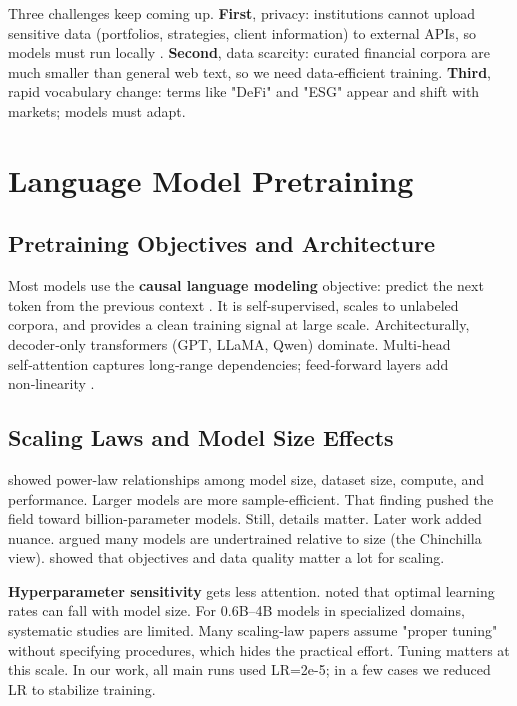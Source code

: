 Three challenges keep coming up. \textbf{First}, privacy: institutions cannot upload sensitive data (portfolios, strategies, client information) to external APIs, so models must run locally \parencite{wu2023bloomberggpt}. \textbf{Second}, data scarcity: curated financial corpora are much smaller than general web text, so we need data‑efficient training. \textbf{Third}, rapid vocabulary change: terms like "DeFi" and "ESG" appear and shift with markets; models must adapt.

\section{Language Model Pretraining}

\subsection{Pretraining Objectives and Architecture}

Most models use the \textbf{causal language modeling} objective: predict the next token from the previous context \parencite{radford2019language, brown2020language}. It is self‑supervised, scales to unlabeled corpora, and provides a clean training signal at large scale. Architecturally, decoder‑only transformers (GPT, LLaMA, Qwen) dominate. Multi‑head self‑attention captures long‑range dependencies; feed‑forward layers add non‑linearity \parencite{vaswani2017attention, touvron2023llama}.

\subsection{Scaling Laws and Model Size Effects}

\textcite{kaplan2020scaling} showed power-law relationships among model size, dataset size, compute, and performance. Larger models are more sample-efficient. That finding pushed the field toward billion-parameter models. Still, details matter. Later work added nuance. \textcite{hoffmann2022training} argued many models are undertrained relative to size (the Chinchilla view). \textcite{tay2022ul2} showed that objectives and data quality matter a lot for scaling.

\textbf{Hyperparameter sensitivity} gets less attention. \textcite{mccandlish2018empirical} noted that optimal learning rates can fall with model size. For 0.6B--4B models in specialized domains, systematic studies are limited. Many scaling‑law papers assume "proper tuning" without specifying procedures, which hides the practical effort. Tuning matters at this scale. In our work, all main runs used LR=2e-5; in a few cases we reduced LR to stabilize training.

